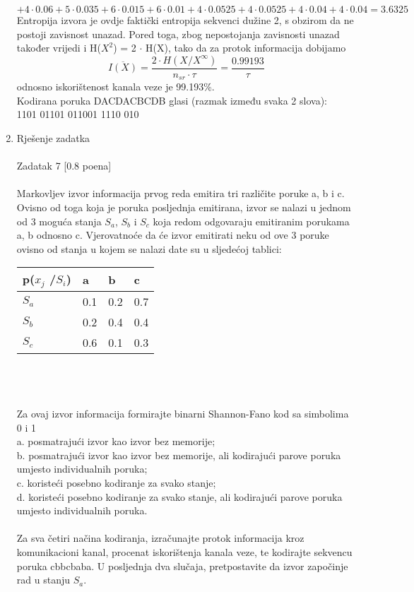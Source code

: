 \documentclass[12pt]{article}
\begin{document}
\begin{enumerate}
\begin{equation*}
\end{equation*}
\begin{equation*}
    + 4 \cdot 0.06 + 5 \cdot 0.035 + 6 \cdot 0.015 + 6 \cdot 0.01 + 4 \cdot 0.0525 +
    4 \cdot 0.0525 + 4 \cdot 0.04 + 4 \cdot 0.04 = 3.6325
\end{equation*}
Entropija izvora je ovdje faktički entropija sekvenci dužine 2, s obzirom
da ne postoji zavisnost unazad. Pored toga, zbog nepostojanja zavisnosti unazad 
također vrijedi i H($X^2$) = 2 ${\cdot}$ H(X), tako da za protok
informacija dobijamo
\begin{equation*}
    \overline{I(X)} = \frac{2 \cdot H(X/X^\infty)}{n_{sr} \cdot \tau} = \frac{0.99193}{\tau}
\end{equation*}
odnosno iskorištenost kanala veze je 99.193\%. \\
Kodirana poruka DACDACBCDB glasi (razmak između svaka 2 slova): \\
1101 01101 011001 1110 010
\\
		\newpage
		\item Rješenje zadatka \\
		\\
		Zadatak 7 [0.8 poena] \\
        \\
Markovljev izvor informacija prvog reda emitira tri različite poruke a, b i c. Ovisno od toga koja je poruka posljednja emitirana, izvor se nalazi u jednom od 3 moguća stanja $S_a$, $S_b$ i $S_c$ koja redom odgovaraju emitiranim porukama a, b odnosno c. Vjerovatnoće da će izvor emitirati neku od ove 3 poruke ovisno od stanja u kojem se nalazi date su u sljedećoj tablici: \\
		
\begin{tabular}{|l|l|l|l|}
\hline
p($x_j$ /$S_i$) & a   & b   & c   \\ \hline
$S_a$        & 0.1 & 0.2 & 0.7 \\ \hline
$S_b$        & 0.2 & 0.4 & 0.4 \\ \hline
$S_c$        & 0.6 & 0.1 & 0.3 \\ \hline
\end{tabular}
\\
\\
\\
Za ovaj izvor informacija formirajte binarni Shannon-Fano kod sa simbolima 0 i 1 \\
a. posmatrajući izvor kao izvor bez memorije; \\
b. posmatrajući izvor kao izvor bez memorije, ali kodirajući parove poruka umjesto individualnih poruka; \\
c. koristeći posebno kodiranje za svako stanje; \\
d. koristeći posebno kodiranje za svako stanje, ali kodirajući parove poruka umjesto individualnih poruka. \\
\\
Za sva četiri načina kodiranja, izračunajte protok informacija kroz komunikacioni kanal, procenat iskorištenja kanala veze, te kodirajte sekvencu poruka cbbcbaba. U posljednja dva slučaja, pretpostavite da izvor započinje rad u stanju $S_a$.


\end{enumerate}
\end{document}
